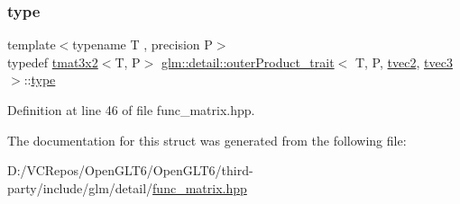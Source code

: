 \subsubsection{\texorpdfstring{type}{type}}
{\footnotesize\ttfamily template$<$typename T , precision P$>$ \\
typedef \mbox{\hyperlink{structglm_1_1tmat3x2}{tmat3x2}}$<$T, P$>$ \mbox{\hyperlink{structglm_1_1detail_1_1outer_product__trait}{glm\+::detail\+::outer\+Product\+\_\+trait}}$<$ T, P, \mbox{\hyperlink{structglm_1_1tvec2}{tvec2}}, \mbox{\hyperlink{structglm_1_1tvec3}{tvec3}} $>$\+::\mbox{\hyperlink{structglm_1_1detail_1_1outer_product__trait_3_01_t_00_01_p_00_01tvec2_00_01tvec3_01_4_a5b6c145bc27bf3a7d04336c578363bf7}{type}}}



Definition at line 46 of file func\+\_\+matrix.\+hpp.



The documentation for this struct was generated from the following file\+:\begin{DoxyCompactItemize}
\item 
D\+:/\+V\+C\+Repos/\+Open\+G\+L\+T6/\+Open\+G\+L\+T6/third-\/party/include/glm/detail/\mbox{\hyperlink{func__matrix_8hpp}{func\+\_\+matrix.\+hpp}}\end{DoxyCompactItemize}
